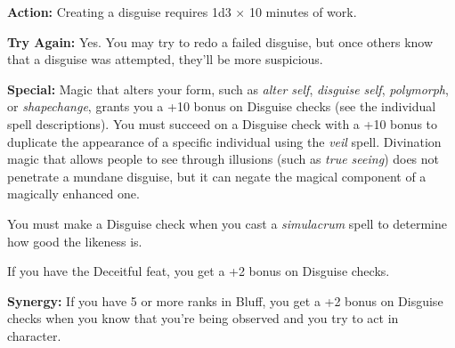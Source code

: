 \textbf{Action:} Creating a disguise requires 1d3 $\times$ 10 minutes of work.

\textbf{Try Again:} Yes. You may try to redo a failed disguise, but once others know that a disguise was attempted, they’ll be more suspicious.

\textbf{Special:} Magic that alters your form, such as \emph{alter self}, \emph{disguise self}, \emph{polymorph}, or \emph{shapechange}, grants you a +10 bonus on Disguise checks (see the individual spell descriptions). You must succeed on a Disguise check with a +10 bonus to duplicate the appearance of a specific individual using the \emph{veil} spell. Divination magic that allows people to see through illusions (such as \emph{true seeing}) does not penetrate a mundane disguise, but it can negate the magical component of a magically enhanced one.

You must make a Disguise check when you cast a \emph{simulacrum} spell to determine how good the likeness is.

If you have the Deceitful feat, you get a +2 bonus on Disguise checks.

\textbf{Synergy:} If you have 5 or more ranks in Bluff, you get a +2 bonus on Disguise checks when you know that you’re being observed and you try to act in character.